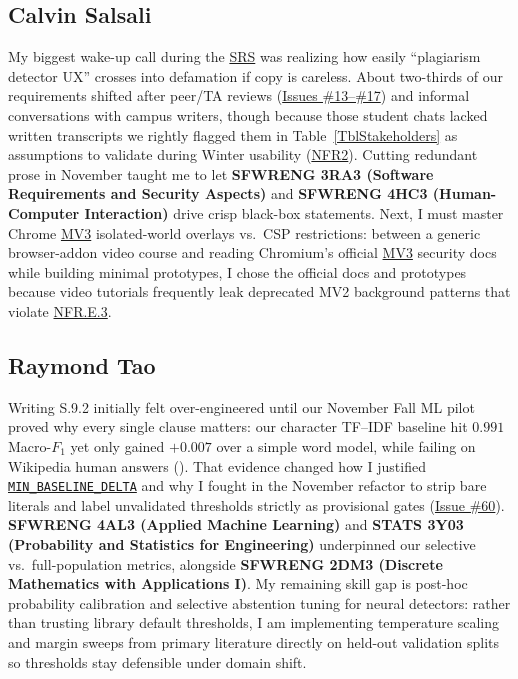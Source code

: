 \documentclass[11pt]{article}
\newcommand{\MinBaselineDelta}{\hyperref[const:MIN_BASELINE_DELTA]{\texttt{MIN\_\allowbreak{}BASELINE\_\allowbreak{}DELTA}}}
\newcommand{\MVThree}{\hyperlink{acr-mv3}{MV3}}
\newcommand{\SRS}{\hyperlink{acr-srs}{SRS}}
\begin{document}
\subsection*{Calvin Salsali}
My biggest wake-up call during the \SRS{} was realizing how easily ``plagiarism detector UX'' crosses into defamation if copy is careless. About two-thirds of our requirements shifted after peer/TA reviews (\href{https://github.com/richy1337/Verity/issues/13}{Issues \#13--\#17}) and informal conversations with campus writers, though because those student chats lacked written transcripts we rightly flagged them in Table~\ref{TblStakeholders} as assumptions to validate during Winter usability (\hyperref[NFR2]{NFR2}). Cutting redundant prose in November taught me to let \textbf{SFWRENG 3RA3 (Software Requirements and Security Aspects)} and \textbf{SFWRENG 4HC3 (Human-Computer Interaction)} drive crisp black-box statements. Next, I must master Chrome \MVThree{} isolated-world overlays vs.\ CSP restrictions: between a generic browser-addon video course and reading Chromium's official \MVThree{} security docs while building minimal prototypes, I chose the official docs and prototypes because video tutorials frequently leak deprecated MV2 background patterns that violate \hyperref[NFR.E.3]{NFR.E.3}.

\subsection*{Raymond Tao}
Writing S.9.2 initially felt over-engineered until our November Fall ML pilot proved why every single clause matters: our character TF--IDF baseline hit $0.991$ Macro-$F_1$ yet only gained $+0.007$ over a simple word model, while failing on Wikipedia human answers (\cite{VerityMLReport2026}). That evidence changed how I justified \MinBaselineDelta{} and why I fought in the November refactor to strip bare literals and label unvalidated thresholds strictly as provisional gates (\href{https://github.com/richy1337/Verity/issues/60}{Issue \#60}). \textbf{SFWRENG 4AL3 (Applied Machine Learning)} and \textbf{STATS 3Y03 (Probability and Statistics for Engineering)} underpinned our selective vs.\ full-population metrics, alongside \textbf{SFWRENG 2DM3 (Discrete Mathematics with Applications I)}. My remaining skill gap is post-hoc probability calibration and selective abstention tuning for neural detectors: rather than trusting library default thresholds, I am implementing temperature scaling and margin sweeps from primary literature directly on held-out validation splits so thresholds stay defensible under domain shift.
\end{document}
